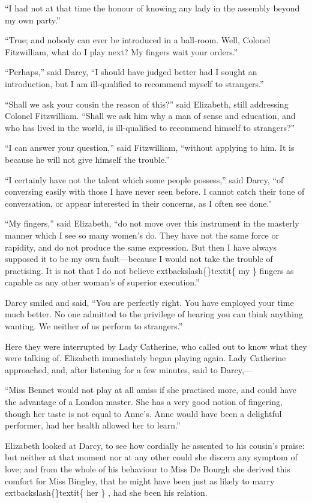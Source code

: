 \documentclass[10pt]{book}
\begin{document}
   “I had not at that time the honour of knowing any lady in the assembly
beyond my own party.”
  

   “True; and nobody can ever be introduced in a ball-room. Well, Colonel
Fitzwilliam, what do I play next? My fingers wait your orders.”
  

   “Perhaps,” said Darcy, “I should have judged better had I sought an
introduction, but I am ill-qualified to recommend myself to strangers.”
  

   “Shall we ask your cousin the reason of this?” said Elizabeth, still
addressing Colonel Fitzwilliam. “Shall we ask him why a man of sense and
education, and who has lived in the world, is ill-qualified to recommend
himself to strangers?”
  

   “I can answer your question,” said Fitzwilliam, “without applying to
him. It is because he will not give himself the trouble.”
  

   “I certainly have not the talent which some people possess,” said Darcy,
“of conversing easily with those I have never seen before. I cannot
catch their tone of conversation, or appear interested in their
concerns, as I often see done.”
  

   “My fingers,” said Elizabeth, “do not move over this instrument in the
masterly manner which I see so many women’s do. They have not the same
force or rapidity, and do not produce the same expression. But then I
have
   always supposed it to be my own fault—because I would not take
the trouble of practising. It is not that I do not believe
   	extbackslash\{\}textit\{
    my
   \}
   fingers
as capable as any other woman’s of superior execution.”
  

   Darcy smiled and said, “You are perfectly right. You have employed your
time much better. No one admitted to the privilege of hearing you can
think anything wanting. We neither of us perform to strangers.”
  

   Here they were interrupted by Lady Catherine, who called out to know
what they were talking of. Elizabeth immediately began playing again.
Lady Catherine approached, and, after listening for a few minutes, said
to Darcy,—
  

   “Miss Bennet would not play at all amiss if she practised more, and
could have the advantage of a London master. She has a very good notion
of fingering, though her taste is not equal to Anne’s. Anne would have
been a delightful performer, had her health allowed her to learn.”
  

   Elizabeth looked at Darcy, to see how cordially he assented to his
cousin’s praise: but neither at that moment nor at any other could she
discern any symptom of love; and from the whole of his behaviour to Miss
De Bourgh she derived this comfort for Miss Bingley, that he might have
been just as likely to marry
   	extbackslash\{\}textit\{
    her
   \}
   , had she been his relation.
  
\end{document}
